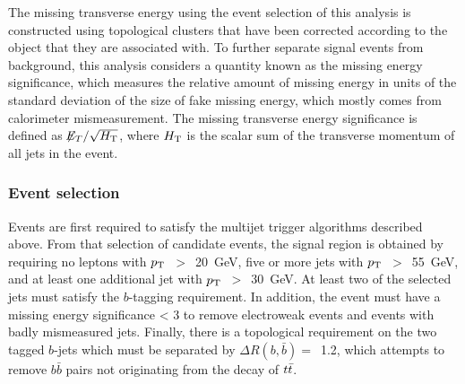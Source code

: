 
The missing transverse energy using the event selection of this analysis is constructed using topological clusters that have been corrected according to the object that they are associated with.
To further separate signal events from background, this analysis considers a quantity known as the missing energy significance, which measures the relative amount of missing energy in units of the standard deviation of the size of fake missing energy, which mostly comes from calorimeter mismeasurement.
The missing transverse energy significance is defined as $\not\!\!{E_{T}}/ \sqrt{H_{\mathrm{T}}}$, where $H_{\mathrm{T}}$ is the scalar sum of the transverse momentum of all jets in the event.



\subsubsection{Event selection}
\label{subsec:EvSel}

Events are first required to satisfy the multijet trigger algorithms described above.
From that selection of candidate events, the signal region is obtained by requiring no leptons with $p_{\rm T}$~$>$~20~GeV, 
five or more jets with $p_{\rm T}$~$>$~55~GeV, and at least one additional jet with $p_{\rm T}$~$>$~30~GeV.
At least two of the selected jets must satisfy the $b$-tagging requirement.
In addition, the event must have a missing energy significance < 3 to remove electroweak events and events with badly mismeasured jets.
Finally, there is a topological requirement on the two tagged $b$-jets which must be separated by $\Delta R(b,\bar{b}) =$~1.2, 
which attempts to remove $b\bar{b}$ pairs not originating from the decay of $t\bar{t}$.

